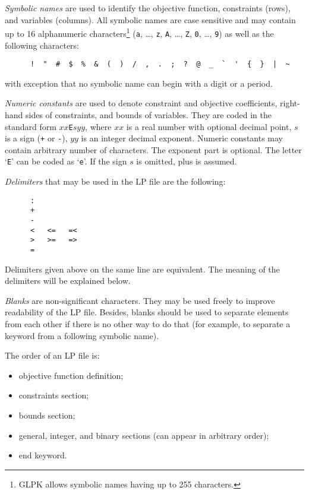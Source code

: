 \newpage

{\it Symbolic names} are used to identify the objective function,
constraints (rows), and variables (columns). All symbolic names are case
sensitive and may contain up to 16 alphanumeric characters\footnote{GLPK
allows symbolic names having up to 255 characters.} (\verb|a|, \dots,
\verb|z|, \verb|A|, \dots, \verb|Z|, \verb|0|, \dots, \verb|9|) as well
as the following characters:

\begin{verbatim}
      !  "  #  $  %  &  (  )  /  ,  .  ;  ?  @  _  `  '  {  }  |  ~
\end{verbatim}

\noindent
with exception that no symbolic name can begin with a digit or
a period.

{\it Numeric constants} are used to denote constraint and objective
coefficients, right-hand sides of constraints, and bounds of variables.
They are coded in the standard form $xx$\verb|E|$syy$, where $xx$ is
a real number with optional decimal point, $s$ is a sign (\verb|+| or
\verb|-|), $yy$ is an integer decimal exponent. Numeric constants may
contain arbitrary number of characters. The exponent part is optional.
The letter `\verb|E|' can be coded as `\verb|e|'. If the sign $s$ is
omitted, plus is assumed.

{\it Delimiters} that may be used in the LP file are the following:

\begin{verbatim}
      :
      +
      -
      <   <=   =<
      >   >=   =>
      =
\end{verbatim}

\noindent
Delimiters given above on the same line are equivalent. The meaning of
the delimiters will be explained below.

{\it Blanks} are non-significant characters. They may be used freely to
improve readability of the LP file. Besides, blanks should be used to
separate elements from each other if there is no other way to do that
(for example, to separate a keyword from a following symbolic name).

The order of an LP file is:

\vspace*{-8pt}

\begin{itemize}
\item objective function definition;

\item constraints section;

\item bounds section;

\item general, integer, and binary sections (can appear in arbitrary
order);

\item end keyword.
\end{itemize}

